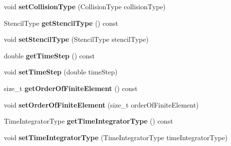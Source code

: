 \begin{DoxyCompactItemize}
\item 
\hypertarget{classnatrium_1_1SolverConfiguration_a81229d6067b27d7d5e3c2f54433a7356}{void {\bfseries set\-Collision\-Type} (Collision\-Type collision\-Type)}\label{classnatrium_1_1SolverConfiguration_a81229d6067b27d7d5e3c2f54433a7356}

\item 
\hypertarget{classnatrium_1_1SolverConfiguration_aa322f097289b1bf070f2eebac9a18dd2}{Stencil\-Type {\bfseries get\-Stencil\-Type} () const }\label{classnatrium_1_1SolverConfiguration_aa322f097289b1bf070f2eebac9a18dd2}

\item 
\hypertarget{classnatrium_1_1SolverConfiguration_a6551279c5aeff9df5a5b6580ae69434a}{void {\bfseries set\-Stencil\-Type} (Stencil\-Type stencil\-Type)}\label{classnatrium_1_1SolverConfiguration_a6551279c5aeff9df5a5b6580ae69434a}

\item 
\hypertarget{classnatrium_1_1SolverConfiguration_a7bee4e8ec36c072d0007df5596fdba62}{double {\bfseries get\-Time\-Step} () const }\label{classnatrium_1_1SolverConfiguration_a7bee4e8ec36c072d0007df5596fdba62}

\item 
\hypertarget{classnatrium_1_1SolverConfiguration_a07640346bb1525ed2e0c6272977920af}{void {\bfseries set\-Time\-Step} (double time\-Step)}\label{classnatrium_1_1SolverConfiguration_a07640346bb1525ed2e0c6272977920af}

\item 
\hypertarget{classnatrium_1_1SolverConfiguration_ac15089081763003182b3b60de135f0d4}{size\-\_\-t {\bfseries get\-Order\-Of\-Finite\-Element} () const }\label{classnatrium_1_1SolverConfiguration_ac15089081763003182b3b60de135f0d4}

\item 
\hypertarget{classnatrium_1_1SolverConfiguration_a4ac66a94dc9a300ce780ce17e3de8705}{void {\bfseries set\-Order\-Of\-Finite\-Element} (size\-\_\-t order\-Of\-Finite\-Element)}\label{classnatrium_1_1SolverConfiguration_a4ac66a94dc9a300ce780ce17e3de8705}

\item 
\hypertarget{classnatrium_1_1SolverConfiguration_a4f00a02f85ffd33640160e1adf894b2e}{Time\-Integrator\-Type {\bfseries get\-Time\-Integrator\-Type} () const }\label{classnatrium_1_1SolverConfiguration_a4f00a02f85ffd33640160e1adf894b2e}

\item 
\hypertarget{classnatrium_1_1SolverConfiguration_afaafedeee6d6bfad773b931c5373e969}{void {\bfseries set\-Time\-Integrator\-Type} (Time\-Integrator\-Type time\-Integrator\-Type)}\label{classnatrium_1_1SolverConfiguration_afaafedeee6d6bfad773b931c5373e969}


\end{DoxyCompactItemize}
